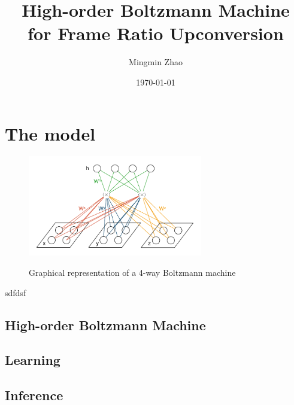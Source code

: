 \documentclass{article}
\begin{document}
\title{\textbf{High-order Boltzmann Machine \\for Frame Ratio Upconversion}}
\author{Mingmin Zhao}

\date{\today}
\maketitle


\section{The model}

\begin{figure}
  \centering
  \includegraphics[width=3in]{4GRBM}\\
  \caption{Graphical representation of a 4-way Boltzmann machine}\label{4GRBM}
\end{figure}
sdfdsf


\subsection{High-order Boltzmann Machine}

\subsection{Learning}


\subsection{Inference}
\end{document}
